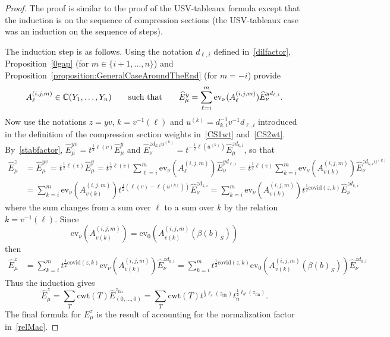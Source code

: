 \documentclass[11pt]{article}
\theoremstyle{plain}
\theoremstyle{definition}
\theoremstyle{remark}
\numberwithin{equation}{section}
\def\CC{\mathbb{C}}
\def\ev{\mathrm{ev}}
\newcounter{r}
\newcounter{s}
\begin{document}
\begin{proof}
The proof is similar to the proof of the USV-tableaux formula except that the induction is on the sequence of compression sections (the USV-tableaux case was an induction on the sequence of steps).



The induction step is as follows. 
Using the notation $d_{\ell,i}$ defined in~\eqref{dilfactor},
Proposition~\ref{0gap} (for $m\in \{i+1, \ldots, n\}$) and
Proposition~\ref{proposition:GeneralCaseAroundTheEnd} (for $m=-i$) 
provide
$$A^{(i,j,m)}_\ell\in \CC(Y_1, \ldots, Y_n) \qquad\hbox{such that}\qquad
\widehat{E}^{y}_\mu 
=\sum_{\ell=i}^m \ev_\nu(A_\ell^{(i,j,m)}) \widehat{E}^{yd_{\ell,i}}_\nu.
$$
Now use the notations $z=yv$, $k=v^{-1}(\ell)$ and $u^{(k)} = d_{k,i}^{-1}v^{-1}d_{\ell,i}$ introduced in the 
definition of the compression section weights in~\eqref{CS1wt} and~\eqref{CS2wt}.
By~\eqref{stabfactor}, $\widehat{E}^{yv}_\mu = t^{\frac12\ell(v)} \widehat{E}^{y}_\mu$ 
and $\widehat{E}^{zd_{k,i}u^{(k)}}_\nu = t^{-\frac12\ell(u^{(k)} ) } \widehat{E}^{zd_{k,i} }_\mu$,
so that 
\begin{align*}
\widehat{E}^z_\mu 
&= \widehat{E}^{yv}_\mu 
=t^{\frac12\ell(v)} \widehat{E}^{y}_\mu 
=t^{\frac12\ell(v)} \sum_{\ell=i}^m \ev_\nu(A_\ell^{(i,j,m)}) \widehat{E}^{y d_{\ell,i}}_\nu 
=t^{\frac12\ell(v)} \sum_{k=i}^m \ev_\nu(A_{v(k)}^{(i,j,m)}) \widehat{E}^{z d_{k,i} u^{(k)}}_\nu 
\\
&=\sum_{k=i}^m \ev_\nu(A_{v(k)}^{(i,j,m)}) t^{\frac12(\ell(v)-\ell(u^{(k)}))} \widehat{E}^{z d_{k,i} }_\nu 
=\sum_{k=i}^m \ev_\nu(A_{v(k)}^{(i,j,m)}) t^{\frac12\mathrm{covid}(z,k)} \widehat{E}^{zd_{k,i}}_\nu
\end{align*}
where the sum changes from a sum over $\ell$ to a sum over $k$ by the relation $k=v^{-1}(\ell)$.
Since
$$\ev_\nu(A_{v(k)}^{(i,j,m)})=\ev_0(A_{v(k)}^{(i,j,m)}(\beta(b)_S))$$
then
\begin{align*}
\widehat{E}^{z}_\mu 
&=\sum_{k=i}^m t^{\frac12\mathrm{covid}(z,k)} \ev_\nu(A_{v(k)}^{(i,j,m)})  \widehat{E}^{zd_{k,i}}_\nu 
=\sum_{k=i}^m t^{\frac12\mathrm{covid}(z,k)} \ev_0(A_{v(k)}^{(i,j,m)}(\beta(b)_S))  \widehat{E}^{zd_{k,i}}_\nu 
\end{align*}
Thus the induction gives
$$\widehat{E}^z_\mu 
= \sum_T \mathrm{cwt}(T)\widehat{E}^{z_{\mathrm{fin}}}_{(0,\ldots,0)}
= \sum_T \mathrm{cwt}(T) t^{\frac12\ell_s(z_{\mathrm{fin}})}t_n^{\frac12\ell_d(z_{\mathrm{fin}})}.
$$
The final formula for  $E^z_\mu$ is the result of accounting for the normalization factor in~\eqref{relMac}.

\end{proof}
\end{document}
